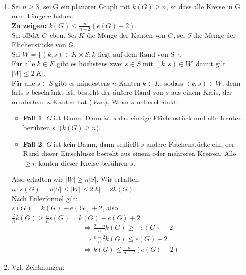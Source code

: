 \begin{solution}
  \
  \begin{enumerate}[label= (\alph*)] 
    \item Sei \( n \geq 3 \), sei G ein planarer Graph mit \( k(G) \geq n \), so dass alle Kreise in G min. Länge \( n \) haben. \\
    \textbf{Zu zeigen:} \( k(G) \leq \frac{n}{n-2}(e(G) - 2) \). \\
    Sei oBdA \( G \) eben. Sei \( K \) die Menge der Kanten von \( G \), sei \( S \) die Menge der Flächenstücke von \( G \). \\
    Sei \( W = \{ (k,s) \in K \times S : k \text{ liegt auf dem Rand von S } \} \). \\
    Für alle \( k \in K \) gibt es höchstens zwei \( s \in S \) mit \( (k,s) \in W \), damit gilt \( \vert W \vert \leq 2 \vert K \vert \). \\
    Für alle \( s \in S \) gibt es mindestens \( n \) Kanten \( k \in K \), sodass \( (k,s) \in W \), denn falls \( s \) beschränkt ist, besteht der äußere Rand von \( s \) aus einem Kreis, der mindestens \( n \) Kanten hat (\emph{Vor.}). Wenn \( s \) unbeschränkt:
    \begin{itemize}
      \item \textbf{Fall 1}: \( G \) ist Baum. Dann ist \( s \) das einzige Flächenstück und alle Kanten berühren \( s \). (\( k(G) \geq n \)).
      \item \textbf{Fall 2}: \( G \) ist kein Baum, dann schließt \( s \) andere Flächenstücke ein, der Rand dieser Einschlüsse besteht aus einem oder mehreren Kreisen. Alle \( \geq n \) kanten dieser Kreise berühren \( s \).
    \end{itemize} 
    Also erhalten wir \( \vert W \vert \geq n \vert S \vert \). Wir erhalten \( n \cdot s(G) = n\vert S \vert \leq \vert W \vert \leq 2 \vert k \vert = 2k(G) \). \\
    Nach Eulerformel gilt: \\
    \( s(G) = k(G) - e(G) + 2 \), also \( \frac{2}{n}k(G) \geq \frac{n}{n} s(G) = k(G) - e(G) + 2 \).
    \begin{align*}
      &\Rightarrow \frac{2-n}{n}k(G) \geq - e(G) + 2 \\
      &\Rightarrow \frac{n-2}{n}k(G) \leq e(G) - 2 \\
      &\Rightarrow k(G) \leq \frac{n}{n-2}(e(G) - 2)
    \end{align*}
    \item Vgl. Zeichnungen:
    \begin{figure}[H]

\end{figure}
\end{enumerate}
\end{solution}
